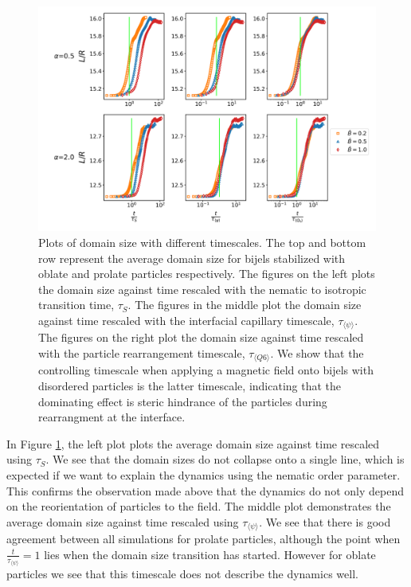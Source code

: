\begin{figure} 
\centering 
\includegraphics[scale=0.4]{../figures/results/paper2/domain_size-field_on-scaled.png} 
\caption{Plots of domain size with different timescales. The top and bottom row represent the average domain size for bijels stabilized with oblate and prolate particles respectively. The figures on the left plots the domain size against time rescaled with the nematic to isotropic transition time, $\tau_S$. The figures in the middle plot the domain size against time rescaled with the interfacial capillary timescale, $\tau_{\langle \psi \rangle}$. The figures on the right plot the domain size against time rescaled with the particle rearrangement timescale, $\tau_{\langle Q6 \rangle}$. We show that the controlling timescale when applying a magnetic field onto bijels with disordered particles is the latter timescale, indicating that the dominating effect is steric hindrance of the particles during rearrangment at the interface.} 
\label{fig:domain_size-field_on-scaled} 
\end{figure}

In Figure \ref{fig:domain_size-field_on-scaled}, the left plot plots the
average domain size against time rescaled using $\tau_S$. We see that
the domain sizes do not collapse onto a single line, which is expected
if we want to explain the dynamics using the nematic order parameter.
This confirms the observation made above that the dynamics do not only
depend on the reorientation of particles to the field. The middle plot
demonstrates the average domain size against time rescaled using
$\tau_{\langle \psi \rangle}$. We see that there is good agreement
between all simulations for prolate particles, although the point when
$\frac{t}{\tau_{\langle \psi \rangle}} = 1$ lies when the domain size
transition has started. However for oblate particles we see that this
timescale does not describe the dynamics well.

